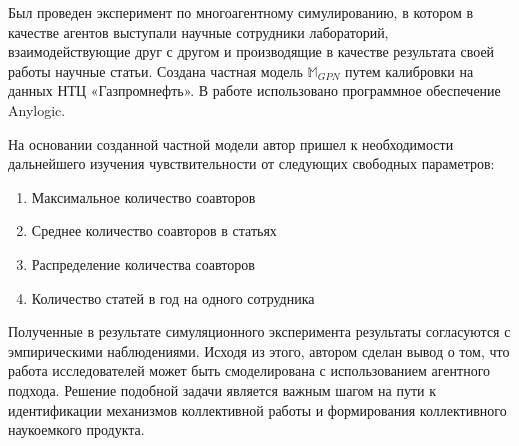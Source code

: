 Был проведен эксперимент по многоагентному симулированию, в котором в качестве агентов выступали научные сотрудники лабораторий, взаимодействующие друг с другом и производящие в качестве результата своей работы научные статьи. Создана частная модель $\mathbb{M}_{GPN}$ путем калибровки на данных НТЦ «Газпромнефть». В работе использовано программное обеспечение Anylogic.

На основании созданной частной модели  автор пришел к необходимости дальнейшего изучения чувствительности от следующих свободных параметров:
\begin{enumerate}
\tightlist
\item Максимальное количество соавторов
\item Среднее количество соавторов в статьях
\item Распределение количества соавторов
\item Количество статей в год на одного сотрудника
\end{enumerate}

Полученные в результате симуляционного эксперимента результаты согласуются с эмпирическими наблюдениями. 
Исходя из этого, автором сделан  вывод о том, что работа исследователей может быть смоделирована с использованием агентного подхода. 
Решение подобной задачи является важным шагом на пути к идентификации механизмов коллективной работы и формирования коллективного наукоемкого продукта.
